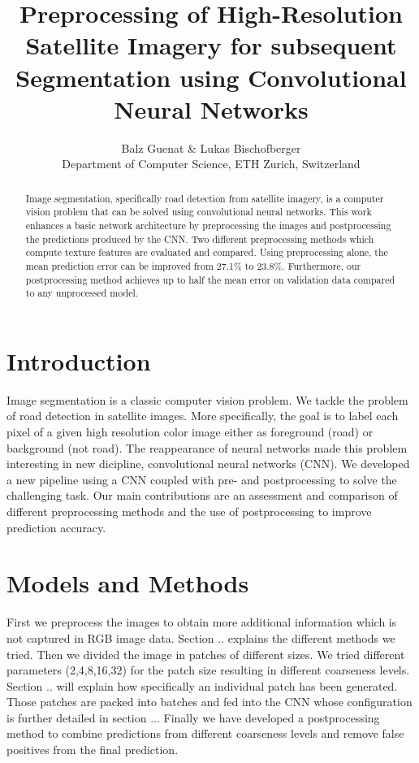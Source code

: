 \documentclass[10pt,conference,compsocconf]{IEEEtran}
\begin{document}
\title{Preprocessing of High-Resolution Satellite Imagery for subsequent \\Segmentation using Convolutional Neural Networks}

\author{
 Balz Guenat \& Lukas Bischofberger\\
  Department of Computer Science, ETH Zurich, Switzerland
}

\maketitle

\begin{abstract}
	Image segmentation, specifically road detection from satellite imagery, is a computer vision problem that can be solved using convolutional neural networks. This work enhances a basic network architecture by preprocessing the images and postprocessing the predictions produced by the CNN. Two different preprocessing methods which compute texture features are evaluated and compared. Using preprocessing alone, the mean prediction error can be improved from 27.1\% to 23.8\%. Furthermore, our postprocessing method achieves up to half the mean error on validation data compared to any unprocessed model.
\end{abstract}

\section{Introduction}
Image segmentation is a classic computer vision problem. We tackle the problem of road detection in satellite images. More specifically, the goal is to label each pixel of a given high resolution color image either as foreground (road) or background (not road). The reappearance of neural networks made this problem interesting in new dicipline, convolutional neural networks (CNN). We developed a new pipeline using a CNN coupled with pre- and postprocessing to solve the challenging task. Our main contributions are an assessment and comparison of different preprocessing methods and the use of postprocessing to improve prediction accuracy.

\section{Models and Methods}
First we preprocess the images to obtain more additional information which is not captured in RGB image data. Section .. explains the different methods we tried.
Then we divided the image in patches of different sizes. We tried different parameters (2,4,8,16,32) for the patch size resulting in different coarseness levels. Section .. will explain how specifically an individual patch has been generated. Those patches are packed into batches and fed into the CNN whose configuration is further detailed in section ... Finally we have developed a postprocessing method to combine predictions from different coarseness levels and remove false positives from the final prediction.
\end{document}
